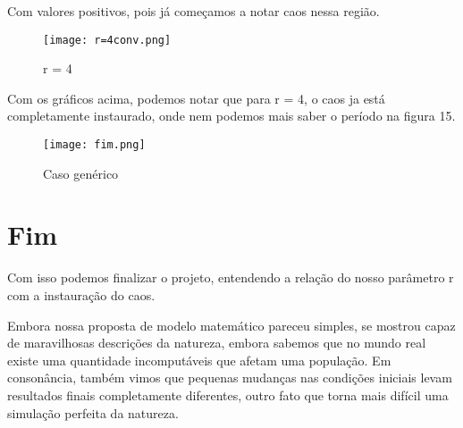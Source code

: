 \documentclass[a4paper, 12pt]{article}
\begin{document}
Com valores positivos, pois já começamos a notar caos nessa região.

\begin{figure}[H]
    \centering
    \texttt{[image: r=4conv.png]}
    \caption{r = 4}
\end{figure}

Com os gráficos acima, podemos notar que para r = 4, o caos ja está completamente instaurado, onde nem podemos mais saber o período na figura 15.

\begin{figure}[H]
    \centering
    \texttt{[image: fim.png]}
    \caption{Caso genérico}
\end{figure}

\section{Fim}

Com isso podemos finalizar o projeto, entendendo a relação do nosso parâmetro r com a instauração do caos.

Embora nossa proposta de modelo matemático pareceu simples, se mostrou capaz de maravilhosas descrições da natureza, embora sabemos que no mundo real existe uma quantidade incomputáveis que afetam uma população. Em consonância, também vimos que pequenas mudanças nas condições iniciais levam resultados finais completamente diferentes, outro fato que torna mais difícil uma simulação perfeita da natureza.
\end{document}
